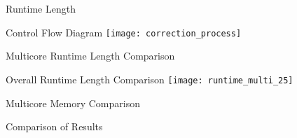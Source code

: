 

\begin{frame}[c]{Runtime Length}
\end{frame}


\begin{frame}[c]{Control Flow Diagram}
    \pause
    \texttt{[image: correction\_process]}
\end{frame}


\begin{frame}[c]{Multicore Runtime Length Comparison}
\end{frame}

\begin{frame}[c]{Overall Runtime Length Comparison}
    \texttt{[image: runtime\_multi\_25]}
\end{frame}

\begin{frame}[c]{Multicore Memory Comparison}
\end{frame}



\begin{frame}[c]{Comparison of Results}
    \begin{figure}
    \subfloat[Uncorrected]{
    \texttt{[image: c\_50kb]}}
     \\
    \subfloat[KR]{             
    \texttt{[image: c\_kr\_50kb]}}
    \end{figure}
\end{frame}

